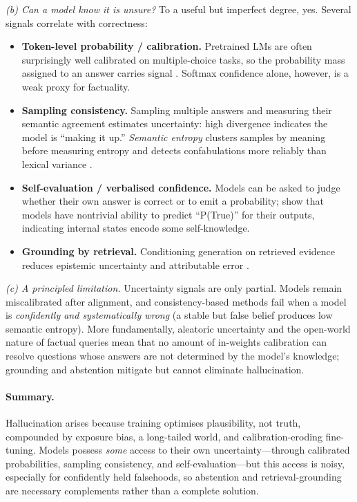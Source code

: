 \documentclass[11pt]{article}
\begin{document}
\emph{(b) Can a model know it is unsure?} To a useful but imperfect degree, yes. Several signals correlate with correctness:
\begin{itemize}[leftmargin=*]
  \item \textbf{Token-level probability / calibration.} Pretrained LMs are often surprisingly well calibrated on multiple-choice tasks, so the probability mass assigned to an answer carries signal \citep{openai2023gpt4}. Softmax confidence alone, however, is a weak proxy for factuality.
  \item \textbf{Sampling consistency.} Sampling multiple answers and measuring their semantic agreement estimates uncertainty: high divergence indicates the model is ``making it up.'' \emph{Semantic entropy} clusters samples by meaning before measuring entropy and detects confabulations more reliably than lexical variance \citep{kuhn2023semantic,farquhar2024detecting}.
  \item \textbf{Self-evaluation / verbalised confidence.} Models can be asked to judge whether their own answer is correct or to emit a probability; \citet{kadavath2022know} show that models have nontrivial ability to predict ``P(True)'' for their outputs, indicating internal states encode some self-knowledge.
  \item \textbf{Grounding by retrieval.} Conditioning generation on retrieved evidence reduces epistemic uncertainty and attributable error \citep{lewis2020retrieval}.
\end{itemize}

\emph{(c) A principled limitation.} Uncertainty signals are only partial. Models remain miscalibrated after alignment, and consistency-based methods fail when a model is \emph{confidently and systematically wrong} (a stable but false belief produces low semantic entropy). More fundamentally, aleatoric uncertainty and the open-world nature of factual queries mean that no amount of in-weights calibration can resolve questions whose answers are not determined by the model's knowledge; grounding and abstention mitigate but cannot eliminate hallucination.

\paragraph{Summary.} Hallucination arises because training optimises plausibility, not truth, compounded by exposure bias, a long-tailed world, and calibration-eroding fine-tuning. Models possess \emph{some} access to their own uncertainty---through calibrated probabilities, sampling consistency, and self-evaluation---but this access is noisy, especially for confidently held falsehoods, so abstention and retrieval-grounding are necessary complements rather than a complete solution.
\end{document}
